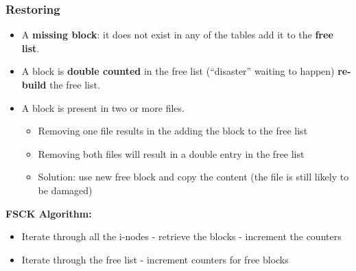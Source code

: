 \documentclass{article}
\begin{document}
\subsubsection{Restoring}
\begin{flushleft}
\begin{itemize}
	\item A \textbf{missing block}: it does not exist in any of the tables add it to the \textbf{free list}.
	\item A block is \textbf{double counted} in the free list (“disaster” waiting to happen) \textbf{re-build} the free list.
	\item A block is present in two or more files.
	\begin{itemize}
		\item Removing one file results in the adding the block to the free list
		\item Removing both files will result in a double entry in the free list
		\item Solution: use new free block and copy the content (the file is still likely to be damaged)
	\end{itemize}
\end{itemize}
\bigskip
\textbf{FSCK Algorithm:}
\begin{itemize}
	\item Iterate through all the i-nodes - retrieve the blocks - increment the counters
	\item Iterate through the free list - increment counters for free blocks
\end{itemize}
\end{flushleft}
\end{document}
